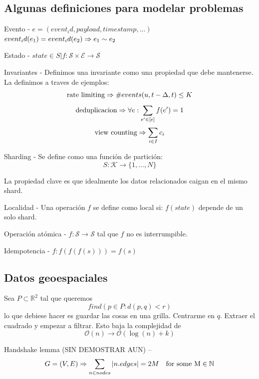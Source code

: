 \subsection{Algunas definiciones para modelar problemas}

\begin{Definition}{Evento}
    - $e = (event_id, payload, timestamp, ...)$ \\
    $event_id(e_1) = event_id(e_2) \Rightarrow e_1 \sim e_2 $
\end{Definition}

\begin{Definition}{Estado}
    - $state \in S | f: \mathcal{S} \times \mathcal{E} \to \mathcal{S} $
\end{Definition}

\begin{Definition}{Invariantes}
    - Definimos una invariante como una propiedad que debe mantenerse. 
    La definimos a traves de ejemplos:
    $$ \text{rate limiting} \Rightarrow \# events(u, t-\Delta, t) \leq K $$
    $$ \text{deduplicacion} \Rightarrow \forall e: \sum_{e' \in [e]} f(e') = 1 $$
    $$ \text{view counting} \Rightarrow  \sum_{i \in I} c_i $$
\end{Definition}

\begin{Definition}{Sharding}
    - Se define como una función de partición:
    $$ S: \mathcal{K} \to \{1, \dots, N\}$$
\end{Definition}

La propiedad clave es que idealmente los datos relacionados caigan en el mismo shard.

\begin{Definition}{Localidad}
    - Una operación $f$ se define como local si:
    $f(state)$ depende de un solo shard.
\end{Definition}


\begin{Definition}{Operación atómica}
    - $f: \mathcal{S} \to \mathcal{S}$ tal que $f$ no es interrumpible.
\end{Definition}

\begin{Definition}{Idempotencia}
    - $f : f(f(f(s))) = f(s)$
\end{Definition}

\subsection{Datos geoespaciales}

Sea $P \subset \mathbb{R}^2$ tal que queremos 
$$ find(p \in P: d(p, q) < r) $$ lo que debiese hacer es guardar las 
cosas en una grilla. Centrarme en $q$. Extraer el cuadrado y empezar a filtrar. 
Esto baja la complejidad de 
$$\mathcal{O}(n) \to \mathcal{O}( \log(n) + k)  $$

\begin{Proposition}{Handshake lemma (SIN DEMOSTRAR AUN)}
    -- $$ G = (V, E) \Rightarrow \sum_{n \in nodes} |n.edges| = 2 M  \quad \text{for some M} \in \mathbb{N} $$
\end{Proposition}